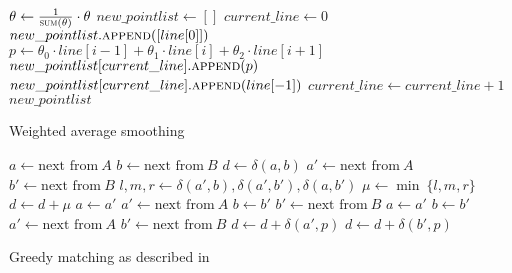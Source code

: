 \begin{algorithm}[ht]
  \begin{algorithmic}
            \State $\theta \gets \frac{1}{\Call{sum}{\theta}} \cdot \theta$ 
            \State $new\_pointlist \gets []$
            \State $current\_line \gets 0$
                \State $new\_pointlist.\Call{append}{[line[0]]}$
                        \State $p \gets \theta_0 \cdot line[i-1] + \theta_1 \cdot line[i] + \theta_2 \cdot line[i+1]$
                        \State $new\_pointlist[current\_line].\Call{append}{p}$
                    \EndFor
                    \State $new\_pointlist[current\_line].\Call{append}{line[-1]}$
                \EndIf
                \State $current\_line \gets current\_line + 1$
            \EndFor
            \Return $new\_pointlist$
        \EndFunction
  \end{algorithmic}
  \caption{Weighted average smoothing}
  \label{alg:weighted-average-smoothing}
\end{algorithm}

\begin{algorithm}[ht]
  \begin{algorithmic}
    \State $a \gets \text{next from}~A$
    \State $b \gets \text{next from}~B$
    \State $d \gets \delta(a,b)$
    \State $a' \gets \text{next from}~A$
    \State $b' \gets \text{next from}~B$
      \State $l, m, r \gets \delta(a',b), \delta(a', b'), \delta(a, b')$
      \State $\mu \gets \min ~\{l, m, r\}$
      \State $d \gets d + \mu$
        \State $a \gets a'$
        \State $a' \gets \text{next from}~A$
        \State $b \gets b'$
        \State $b' \gets \text{next from}~B$
      \Else
        \State $a \gets a'$
        \State $b \gets b'$
        \State $a' \gets \text{next from}~A$
        \State $b' \gets \text{next from}~B$
      \EndIf
    \EndWhile
        \State $d \gets d + \delta(a',p)$
      \EndFor
        \State $d \gets d + \delta(b',p)$
      \EndFor
    \EndIf
  \end{algorithmic}
  \caption{Greedy matching as described in \cite{Kirsch}}
  \label{alg:greedy-matching}
\end{algorithm}

